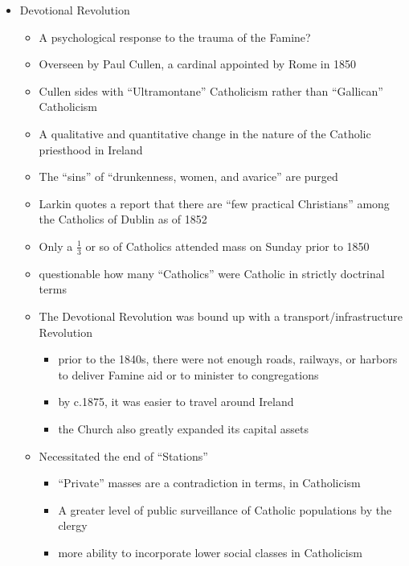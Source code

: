 \documentclass[12pt]{article}
\begin{document}
\begin{itemize}
\begin{itemize}
                \end{itemize}
                \item Devotional Revolution
                \begin{itemize}
                    \item A psychological response to the trauma of the Famine?
                    \item Overseen by Paul Cullen, a cardinal appointed by Rome in 1850
                    \item Cullen sides with ``Ultramontane'' Catholicism rather than ``Gallican'' Catholicism
                    \item A qualitative and quantitative change in the nature of the Catholic priesthood in Ireland
                    \item The ``sins'' of ``drunkenness, women, and avarice'' are purged
                    \item Larkin quotes a report that there are ``few practical Christians'' among the Catholics of Dublin as of 1852
                    \item Only a $\frac{1}{3}$ or so of Catholics attended mass on Sunday prior to 1850
                    \item questionable how many ``Catholics'' were Catholic in strictly doctrinal terms
                    \item The Devotional Revolution was bound up with a transport/infrastructure Revolution
                    \begin{itemize}
                        \item prior to the 1840s, there were not enough roads, railways, or harbors to deliver Famine aid or to minister to congregations
                        \item by c.1875, it was easier to travel around Ireland
                        \item the Church also greatly expanded its capital assets
                    \end{itemize}
                    \item Necessitated the end of ``Stations''
                    \begin{itemize}
                        \item ``Private'' masses are a contradiction in terms, in Catholicism
                        \item A greater level of public surveillance of Catholic populations by the clergy
                        \item more ability to incorporate lower social classes in Catholicism

\end{itemize}
\end{itemize}
\end{itemize}
\end{document}
